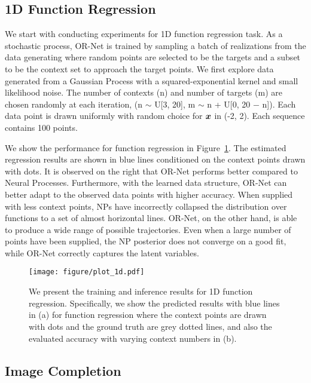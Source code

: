 \documentclass[sigconf]{acmart} %
\begin{document}
\subsection{1D Function Regression}
We start with conducting experiments for 1D function regression task.
As a stochastic process, OR-Net is trained by sampling a batch of realizations from the data generating where random points are selected to be the targets and a subset to be the context set to approach the target points. We first explore data generated from a Gaussian Process with a squared-exponential kernel and small likelihood noise. The number of contexts (n) and number of targets (m) are chosen randomly at each iteration, (n $\sim$ U[3, 20], m $\sim$ n + U[0, 20 $-$ n]). Each data point is drawn uniformly with random choice for ${\bm{x}}$ in (-2, 2). Each sequence contains 100 points.

We show the performance for function regression in Figure~\ref{fig:demo_1d}. The estimated regression results are shown in blue lines conditioned on the context points drawn with dots. It is observed on the right that OR-Net performs better compared to Neural Processes. Furthermore, with the learned data structure, OR-Net can better adapt to the observed data points with higher accuracy. When supplied with less context points, NPs have incorrectly collapsed the distribution over functions to a set of almost horizontal lines. OR-Net, on the other hand, is able to produce a wide range of possible trajectories. Even when a large number of points have been supplied, the NP posterior does not converge on a good fit, while OR-Net correctly captures the latent variables. 



\begin{figure}[t]
  \centering
  \texttt{[image: figure/plot\_1d.pdf]}
  \caption{
    We present the training and inference results for 1D function regression. Specifically, we show the predicted results with blue lines in (a) for function regression where the context points are drawn with dots and the ground truth are grey dotted lines, and also the evaluated accuracy with varying context numbers in (b). 
  }
  \label{fig:demo_1d}
\end{figure}




\subsection{Image Completion}
\end{document}
